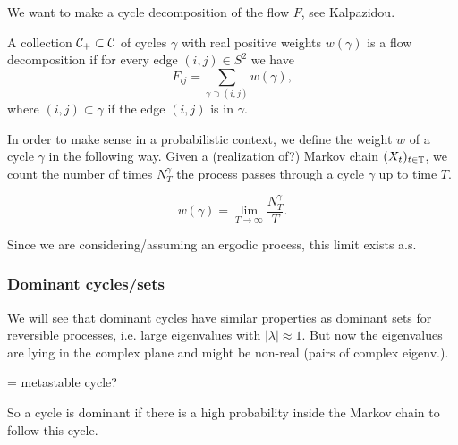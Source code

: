 We want to make a cycle decomposition of the flow $F$, see Kalpazidou\cite{kalpazidou2007}.

\begin{defi}
A collection $\mathcal{C}_+ \subset \mathcal{C}$ of cycles $\gamma$ with real positive weights $w(\gamma)$ is a flow decomposition if for every edge $(i,j) \in S^2$ we have
\begin{equation*}
F_{ij} = \sum_{\gamma \supset (i,j)} w(\gamma),
\end{equation*}
where $(i,j) \subset \gamma$ if the edge $(i,j)$ is in $\gamma$.
\end{defi}

In order to make sense in a probabilistic context, we define the weight $w$ of a cycle $\gamma$ in the following way. Given a (realization of?) Markov chain $(X_t)_{t \in \mathbb{T}}$, we count the number of times $N_T^\gamma$ the process passes through a cycle $\gamma$ up to time $T$.

\begin{defi}
\begin{equation*}
w(\gamma) = \lim_{T \rightarrow \infty} \frac{N_T^\gamma}{T}.
\end{equation*}
\end{defi}
Since we are considering/assuming an ergodic process, this limit exists a.s. 


\subsubsection*{Dominant cycles/sets}

We will see that dominant cycles have similar properties as dominant sets for reversible processes, i.e. large eigenvalues with $|\lambda| \approx 1$. But now the eigenvalues are lying in the complex plane and might be non-real (pairs of complex eigenv.).

\begin{defi}
= metastable cycle?
\end{defi}

So a cycle is dominant if there is a high probability inside the Markov chain to follow this cycle.


